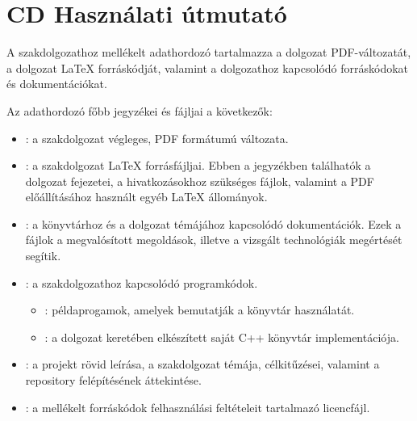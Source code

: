 \pagestyle{empty}

\section*{CD Használati útmutató}

A szakdolgozathoz mellékelt adathordozó tartalmazza a dolgozat PDF-változatát,
a dolgozat \LaTeX{} forráskódját, valamint a dolgozathoz kapcsolódó
forráskódokat és dokumentációkat.

Az adathordozó főbb jegyzékei és fájljai a következők:

\begin{itemize}
    \item {}: a szakdolgozat végleges, PDF formátumú változata.

    \item {}: a szakdolgozat \LaTeX{} forrásfájljai. Ebben a jegyzékben találhatók a dolgozat fejezetei, a hivatkozásokhoz szükséges fájlok, valamint a PDF előállításához használt egyéb \LaTeX{} állományok.

    \item {}: a könyvtárhoz és a dolgozat témájához kapcsolódó dokumentációk. Ezek a fájlok a megvalósított megoldások, illetve a vizsgált technológiák megértését segítik.

    \item {}: a szakdolgozathoz kapcsolódó programkódok.

    \begin{itemize}
        \item {}: példaprogamok, amelyek bemutatják a könyvtár használatát.

        \item {}: a dolgozat keretében elkészített saját C++ könyvtár implementációja.
    \end{itemize}

    \item {}: a projekt rövid leírása, a szakdolgozat témája, célkitűzései, valamint a repository felépítésének áttekintése.

    \item {}: a mellékelt forráskódok felhasználási feltételeit tartalmazó licencfájl.
\end{itemize}
